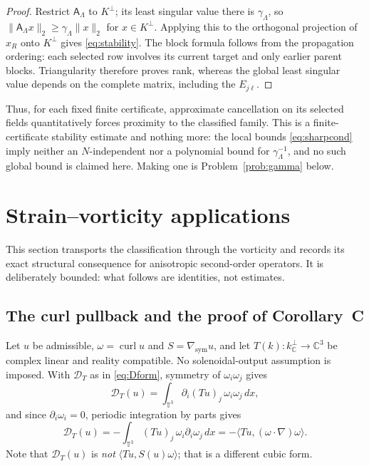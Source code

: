 \documentclass[11pt]{article}
\theoremstyle{definition}
\theoremstyle{remark}
\theoremstyle{plain}
\DeclareMathOperator{\curl}{curl}
\newcommand{\T}{\mathbb{T}}
\newcommand{\C}{\mathbb{C}}
\newcommand{\Dform}{\mathcal{D}}
\newcommand{\kperp}{k_{\C}^{\perp}}
\newcommand{\gsym}{\nabla_{\mathrm{sym}}}
\begin{document}
\begin{proof}
Restrict $\mathsf A_{\Lambda}$ to $K^{\perp}$; its least singular value there
is $\gamma_{\Lambda}$, so
$\|\mathsf A_{\Lambda}x\|_{2}\ge\gamma_{\Lambda}\|x\|_{2}$ for
$x\in K^{\perp}$. Applying this to the orthogonal projection of $x_{R}$ onto
$K^{\perp}$ gives \eqref{eq:stability}. The block formula follows from the
propagation ordering: each selected row involves its current target and only
earlier parent blocks. Triangularity therefore proves rank, whereas the global
least singular value depends on the complete matrix, including the
$E_{j\ell}$.
\end{proof}

Thus, for each fixed finite certificate, approximate cancellation on its
selected fields quantitatively forces proximity to the classified family. This
is a finite-certificate stability estimate and nothing more: the local bounds
\eqref{eq:sharpcond} imply neither an $N$-independent nor a polynomial bound
for $\gamma_{\Lambda}^{-1}$, and no such global bound is claimed here. Making
one is Problem~\ref{prob:gamma} below.

\section{Strain--vorticity applications}
\label{sec:strainvorticity}

This section transports the classification through the vorticity and records
its exact structural consequence for anisotropic second-order operators. It is
deliberately bounded: what follows are identities, not estimates.

\subsection{The curl pullback and the proof of Corollary~C}
\label{subsec:pullback}

Let $u$ be admissible, $\omega=\curl u$ and $S=\gsym u$, and let
$T(k):\kperp\to\C^{3}$ be complex linear and reality compatible. No
solenoidal-output assumption is imposed. With $\Dform_{T}$ as in
\eqref{eq:Dform}, symmetry of $\omega_{i}\omega_{j}$ gives
\[
\Dform_{T}(u)
=\int_{\T^{3}}\partial_{i}(Tu)_{j}\,\omega_{i}\omega_{j}\,dx ,
\]
and since $\partial_{i}\omega_{i}=0$, periodic integration by parts gives
\begin{equation}
\label{eq:byparts}
\Dform_{T}(u)
=-\int_{\T^{3}}(Tu)_{j}\,\omega_{i}\partial_{i}\omega_{j}\,dx
=-\langle Tu,(\omega\cdot\nabla)\omega\rangle .
\end{equation}
Note that $\Dform_{T}(u)$ is \emph{not} $\langle Tu,S(u)\omega\rangle$; that
is a different cubic form.
\end{document}
